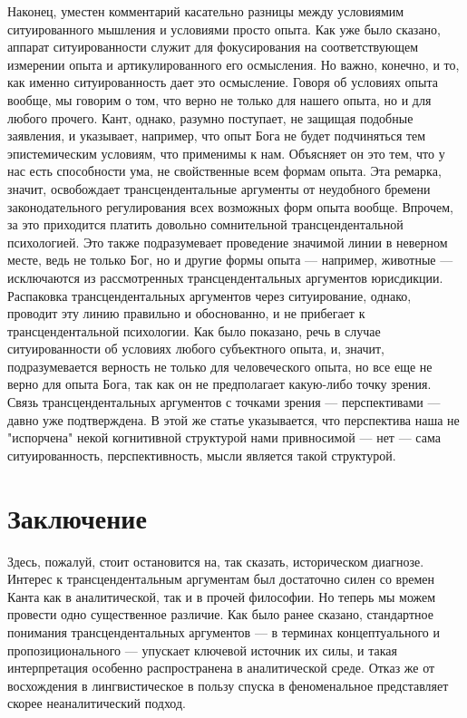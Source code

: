 \documentclass{article}
\begin{document}
Наконец, уместен комментарий касательно разницы между условиямим ситуированного мышления и условиями просто опыта. Как уже было сказано, аппарат ситуированности служит для фокусирования на соответствующем измерении опыта и артикулированного его осмысления. Но важно, конечно, и то, как именно ситуированность дает это осмысление. Говоря об условиях опыта вообще, мы говорим о том, что верно не только для нашего опыта, но и для любого прочего. Кант, однако, разумно поступает, не защищая подобные заявления, и указывает, например, что опыт Бога не будет подчиняться тем эпистемическим условиям, что применимы к нам. Объясняет он это тем, что у нас есть способности ума, не свойственные всем формам опыта. Эта ремарка, значит, освобождает трансцендентальные аргументы от неудобного бремени законодательного регулирования всех возможных форм опыта вообще. Впрочем, за это приходится платить довольно сомнительной трансцендентальной психологией. Это также подразумевает проведение значимой линии в неверном месте, ведь не только Бог, но и другие формы опыта — например, животные — исключаются из рассмотренных трансцендентальных аргументов юрисдикции. Распаковка трансцендентальных аргументов через ситуирование, однако, проводит эту линию правильно и обоснованно, и не прибегает к трансцендентальной психологии. Как было показано, речь в случае ситуированности об условиях любого субъектного опыта, и, значит, подразумевается верность не только для человеческого опыта, но все еще не верно для опыта Бога, так как он не предполагает какую-либо точку зрения. Связь трансцендентальных аргументов с точками зрения — перспективами — давно уже подтверждена. В этой же статье указывается, что перспектива наша не "испорчена" некой когнитивной структурой нами привносимой — нет — сама ситуированность, перспективность, мысли является такой структурой.

\section{Заключение}

Здесь, пожалуй, стоит остановится на, так сказать, историческом диагнозе. Интерес к трансцендентальным аргументам был достаточно силен со времен Канта как в аналитической, так и в прочей философии. Но теперь мы можем провести одно существенное различие. Как было ранее сказано, стандартное понимания трансцендентальных аргументов — в терминах концептуального и пропозиционального — упускает ключевой источник их силы, и такая интерпретация особенно распространена в аналитической среде. Отказ же от восхождения в лингвистическое в пользу спуска в феноменальное представляет скорее неаналитический подход.
\end{document}
